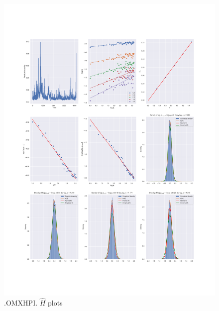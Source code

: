 	\begin{figure}[h]
		\centering
		\includegraphics[width=\linewidth]{fig/.OMXHPI.pdf}
		\caption{.OMXHPI. $\hat{H}$ plots}
	\end{figure}

